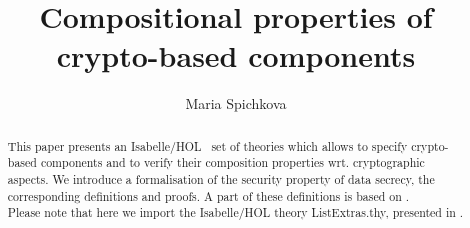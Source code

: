 \documentclass[11pt,a4paper]{article}
\begin{document}
\title{Compositional properties of crypto-based components}
\author{Maria Spichkova}
\maketitle


\begin{abstract}
This paper presents an Isabelle/HOL~\cite{npw} set of theories which allows  to specify
crypto-based components and to verify their composition properties wrt. cryptographic aspects.  
We introduce a formalisation of the security property of data secrecy, 
the corresponding definitions and proofs. 
A part of these definitions is based on  \cite{sj_TB08}.\\
Please note that here we import the Isabelle/HOL theory ListExtras.thy, presented in \cite{FocusStreamsCaseStudies-AFP}.
\end{abstract}

\tableofcontents
 
\newpage

 


\end{document}
